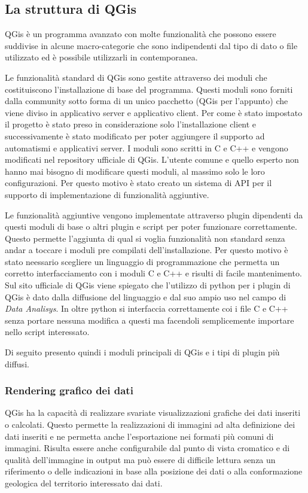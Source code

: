 \subsection{La struttura di QGis}
QGis è un programma avanzato con molte funzionalità che possono essere suddivise in alcune macro-categorie che sono indipendenti dal tipo di dato o file utilizzato ed è possibile utilizzarli in contemporanea.


Le funzionalità standard di QGis sono gestite attraverso dei moduli che costituiscono l'installazione di base del programma. Questi moduli sono forniti dalla community sotto forma di un unico pacchetto (QGis per l'appunto) che viene diviso in applicativo server e applicativo client. Per come è stato impostato il progetto è stato preso in considerazione solo l'installazione client e successivamente è stato modificato per poter aggiungere il supporto ad automatismi e applicativi server. I moduli sono scritti in C e C++ e vengono modificati nel repository ufficiale di QGis. L'utente comune e quello esperto non hanno mai bisogno di modificare questi moduli, al massimo solo le loro configurazioni. Per questo motivo è stato creato un sistema di API per il supporto di implementazione di funzionalità aggiuntive.

Le funzionalità aggiuntive vengono implementate attraverso plugin dipendenti da questi moduli di base o altri plugin e script per poter funzionare correttamente. Questo permette l'aggiunta di qual si voglia funzionalità non standard senza andar a toccare i moduli pre compilati dell'installazione.
Per questo motivo è stato neessario scegliere un linguaggio di programmazione che permetta un corretto interfacciamento con i moduli C e C++ e risulti di facile mantenimento. Sul sito ufficiale di QGis \cite{site:qgis} viene spiegato che l'utilizzo di python per i plugin di QGis è dato dalla diffusione del linguaggio e dal suo ampio uso nel campo di \textit{Data Analisys}. In oltre python si interfaccia correttamente coi i file C e C++ senza portare nessuna modifica a questi ma facendoli semplicemente importare nello script interessato.

Di seguito presento quindi i moduli principali di QGis e i tipi di plugin più diffusi.

\subsubsection{Rendering grafico dei dati}
QGis ha la capacità di realizzare svariate visualizzazioni grafiche dei dati inseriti o calcolati. 
Questo permette la realizzazioni di immagini ad alta definizione dei dati inseriti e ne permetta anche l'esportazione nei formati più comuni di immagini. Risulta essere anche configurabile dal punto di vista cromatico e di qualità dell'immagine in output ma può essere di difficile lettura senza un riferimento o delle indicazioni in base alla posizione dei dati o alla conformazione geologica del territorio interessato dai dati.

